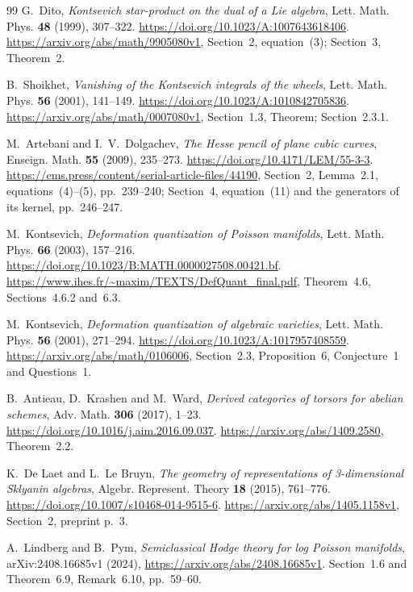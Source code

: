 \begin{thebibliography}{99}
G.~Dito,
\emph{Kontsevich star-product on the dual of a Lie algebra},
Lett. Math. Phys. \textbf{48} (1999), 307--322.
\url{https://doi.org/10.1023/A:1007643618406}.
\url{https://arxiv.org/abs/math/9905080v1},
Section~2, equation~(3); Section~3, Theorem~2.

B.~Shoikhet,
\emph{Vanishing of the Kontsevich integrals of the wheels},
Lett. Math. Phys. \textbf{56} (2001), 141--149.
\url{https://doi.org/10.1023/A:1010842705836}.
\url{https://arxiv.org/abs/math/0007080v1},
Section~1.3, Theorem; Section~2.3.1.

M.~Artebani and I.~V.~Dolgachev,
\emph{The Hesse pencil of plane cubic curves},
Enseign. Math. \textbf{55} (2009), 235--273.
\url{https://doi.org/10.4171/LEM/55-3-3}.
\url{https://ems.press/content/serial-article-files/44190},
Section~2, Lemma~2.1, equations~(4)--(5), pp.~239--240;
Section~4, equation~(11) and the generators of its kernel, pp.~246--247.


M.~Kontsevich, \emph{Deformation quantization of Poisson manifolds},
Lett. Math. Phys. \textbf{66} (2003), 157--216.
\url{https://doi.org/10.1023/B:MATH.0000027508.00421.bf}.
\url{https://www.ihes.fr/~maxim/TEXTS/DefQuant_final.pdf},
Theorem~4.6, Sections~4.6.2 and~6.3.

M.~Kontsevich, \emph{Deformation quantization of algebraic varieties},
Lett. Math. Phys. \textbf{56} (2001), 271--294.
\url{https://doi.org/10.1023/A:1017957408559}.
\url{https://arxiv.org/abs/math/0106006},
Section~2.3, Proposition~6, Conjecture~1 and Questions~1.

B.~Antieau, D.~Krashen and M.~Ward,
\emph{Derived categories of torsors for abelian schemes},
Adv. Math. \textbf{306} (2017), 1--23.
\url{https://doi.org/10.1016/j.aim.2016.09.037}.
\url{https://arxiv.org/abs/1409.2580}, Theorem~2.2.

K.~De Laet and L.~Le Bruyn,
\emph{The geometry of representations of 3-dimensional Sklyanin algebras},
Algebr. Represent. Theory \textbf{18} (2015), 761--776.
\url{https://doi.org/10.1007/s10468-014-9515-6}.
\url{https://arxiv.org/abs/1405.1158v1}, Section~2, preprint p.~3.

A.~Lindberg and B.~Pym,
\emph{Semiclassical Hodge theory for log Poisson manifolds},
arXiv:2408.16685v1 (2024),
\url{https://arxiv.org/abs/2408.16685v1}.
Section~1.6 and Theorem~6.9, Remark~6.10, pp.~59--60.


\end{thebibliography}

